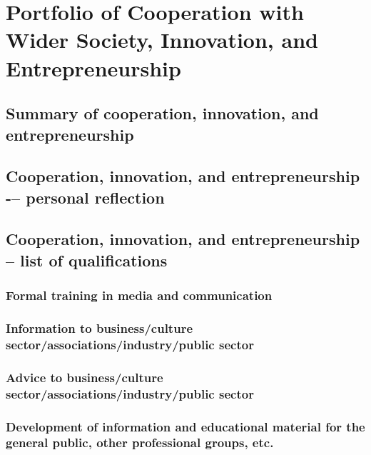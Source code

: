 \chapter{Portfolio of Cooperation with Wider Society, Innovation, and Entrepreneurship}

\section{Summary of cooperation, innovation, and entrepreneurship} \label{sec:summary-of-cooperation-innovation-and-entrepreneurship}

\section{Cooperation, innovation, and entrepreneurship -– personal reflection} \label{sec:cooperation-innovation-and-entrepreneurship-personal-reflection}

\section{Cooperation, innovation, and entrepreneurship – list of qualifications} \label{sec:cooperation-innovation-and-entrepreneurship-list-of-qualifications}

\subsection{Formal training in media and communication} \label{ssec:formal-training-in-media-and-communication}
\subsection{Information to business/culture sector/associations/industry/public sector} \label{ssec:information-to-business-culture-sector-associations-industry-public-sector}
\subsection{Advice to business/culture sector/associations/industry/public sector} \label{ssec:advice-to-business-culture-sector-associations-industry-public-sector}
\subsection{Development of information and educational material for the general public, other professional groups, etc.} \label{ssec:development-of-information-and-educational-material-for-the-general-public-other-professional-groups-etc}
